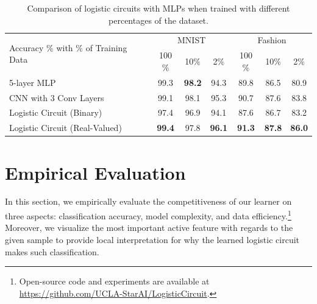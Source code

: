 \documentclass[letterpaper]{article} %
\begin{document}
   \begin{table}[tb]
          \caption{Comparison of logistic circuits with MLPs when trained with different percentages of the dataset.}
          \label{table: data efficiency}
          \centering
          {\fontsize{9}{9}\selectfont
          \begin{sc}
          \begin{tabular}{ @{}l c c c c c c@{} }
          \toprule
        \multirow{2}{*}{Accuracy $\%$  with $\%$ of Training Data }& \multicolumn{3}{c}{MNIST} & \multicolumn{3}{c}{Fashion}\\
	\cmidrule{2-4} \cmidrule{5-7} 
	&100$\%$ & 10$\%$ & 2$\%$ & 100$\%$ & 10$\%$ & 2$\%$ \\
	          \midrule\midrule
	5-layer MLP & 99.3 & {\bf 98.2} &  94.3   & 89.8 & 86.5 & 80.9 \\ 
	CNN with 3 Conv Layers & 99.1 & 98.1 & 95.3 &90.7 & 87.6 & 83.8  \\
	\midrule
                   	Logistic Circuit (Binary) &  97.4 & 96.9 &  94.1 & 87.6 & 86.7 & 83.2 \\
         	Logistic Circuit (Real-Valued) &  {\bf 99.4} & 97.8 &  {\bf 96.1} & {\bf 91.3} & {\bf 87.8} & {\bf 86.0} \\
       		\bottomrule
		\end{tabular}
          \end{sc}
          }
   \end{table}

\section{Empirical Evaluation} \label{s:experiments}

In this section, we empirically evaluate the competitiveness of our learner on three aspects: classification accuracy, model complexity,  and data efficiency.\footnote{Open-source code and experiments are available at 
\url{https://github.com/UCLA-StarAI/LogisticCircuit}.}
 Moreover, we visualize the most important active feature with regards to the given sample to provide local interpretation for why the learned logistic circuit makes such classification.
\end{document}
